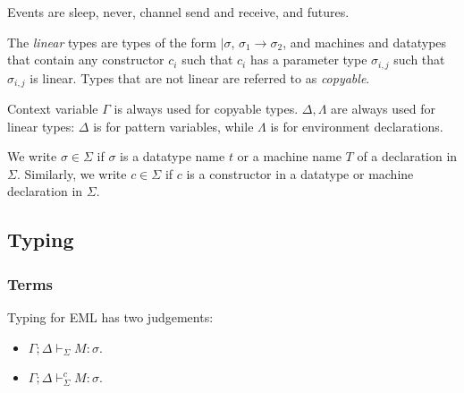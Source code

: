 \documentclass[acmsmall]{acmart}
\begin{document}
Events are sleep, never, channel send and receive, and futures.

The {\it linear} types are types of the form $|\sigma$, $\sigma_1 \to \sigma_2$, and
machines and datatypes that contain any constructor $c_i$ such that
$c_i$ has a parameter type $\sigma_{i,j}$ such that $\sigma_{i,j}$ is
linear. Types that are not linear are referred to as {\it copyable}.

Context variable $\Gamma$ is always used for copyable types. $\Delta, \Lambda$ are
always used for linear types: $\Delta$ is for pattern variables, while
$\Lambda$ is for environment declarations.

We write $\sigma \in \Sigma$ if $\sigma$ is a datatype name $t$ or a machine name $T$
of a declaration in $\Sigma$. Similarly, we write $c \in \Sigma$ if $c$ is a
constructor in a datatype or machine declaration in $\Sigma$.

\subsection{Typing}

\subsubsection{Terms}

Typing for EML has two judgements:
\begin{itemize}
\item $\Gamma; \Delta \vdash_\Sigma M : \sigma$.
\item $\Gamma; \Delta \vdash_\Sigma^c M : \sigma$.
\end{itemize}
\end{document}
